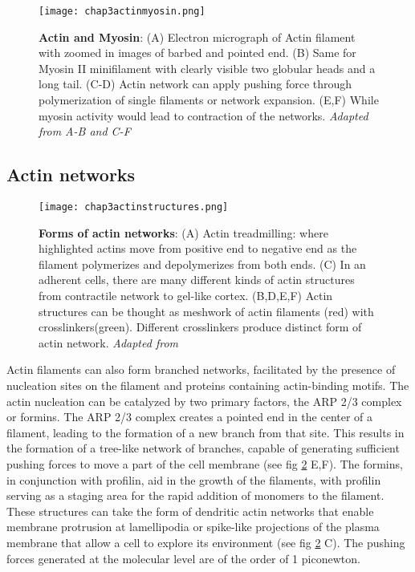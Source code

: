 \begin{figure} []
	\centering
	\texttt{[image: chap3actinmyosin.png]}
	\caption{\label{fig_3_1} \textbf{Actin and Myosin}: (A) Electron micrograph of Actin filament with zoomed in images of barbed and pointed end. (B) Same for Myosin II minifilament with clearly visible two globular heads and a long tail. (C-D) Actin network can apply pushing force through polymerization of single filaments or network expansion. (E,F) While myosin activity would lead to contraction of the networks. \textit{Adapted from A-B \cite{alberts2015} and C-F \cite{clarke2021}}
	}
\end{figure}

\hypertarget{actin-networks}{%
	\subsection{Actin networks}\label{actin-networks}}

\begin{figure}[b!]
	\centering
	\texttt{[image: chap3actinstructures.png]}
	\caption{\label{fig_3_2} \textbf{Forms of actin networks}: (A) Actin treadmilling: where highlighted actins move from positive end to negative end as the filament polymerizes and depolymerizes from both ends. (C) In an adherent cells, there are many different kinds of actin structures from contractile network to gel-like cortex. (B,D,E,F) Actin structures can be thought as meshwork of actin filaments (red) with crosslinkers(green). Different crosslinkers produce distinct form of actin network.  \textit{Adapted from \cite{alberts2015}}
	}
\end{figure}

Actin filaments can also form branched networks, facilitated by the presence of nucleation sites on the filament and proteins containing actin-binding motifs. The actin nucleation can be catalyzed by two primary factors, the ARP 2/3 complex or formins. The ARP 2/3 complex creates a pointed end in the center of a filament, leading to the formation of a new branch from that site. This results in the formation of a tree-like network of branches, capable of generating sufficient pushing forces to move a part of the cell membrane (see fig \ref{fig_3_2} E,F). The formins, in conjunction with profilin, aid in the growth of the filaments, with profilin serving as a staging area for the rapid addition of monomers to the filament. These structures can take the form of dendritic actin networks that enable membrane protrusion at lamellipodia or spike-like projections of the plasma membrane that allow a cell to explore its environment (see fig \ref{fig_3_2} C). The pushing forces generated at the molecular level are of the order of 1 piconewton.


